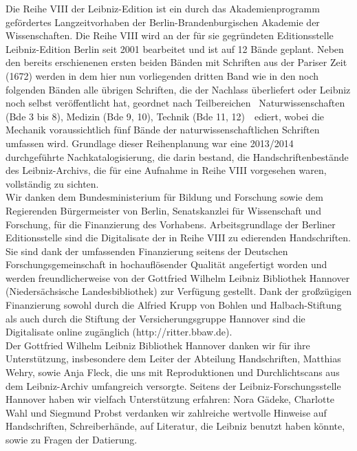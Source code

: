 \thispagestyle{empty}
{\vrule height 0mm depth 30mm width 0mm}
\vspace*{2em}
\par\noindent 
Die Reihe VIII der Leibniz-Edition ist ein durch das Akademienprogramm gefördertes Langzeitvorhaben der Berlin-Brandenburgischen Akademie der Wissenschaften. Die Reihe VIII wird an der für sie gegründeten Editionsstelle Leibniz-Edition Berlin seit 2001 bearbeitet und  ist auf 12 Bände geplant. Neben den bereits erschienenen ersten beiden Bänden mit Schriften aus der Pariser Zeit (1672) werden in dem hier nun vorliegenden dritten Band wie in den noch folgenden Bänden alle übrigen Schriften, die der Nachlass überliefert oder Leibniz noch selbst veröffentlicht hat, geordnet nach Teilbereichen \textendash\ Naturwissenschaften (Bde 3 bis 8), Medizin (Bde 9, 10), Technik (Bde 11, 12)\ \textendash\  ediert, wobei die Mechanik voraussichtlich fünf Bände der naturwissenschaftlichen Schriften umfassen wird. Grundlage dieser Reihenplanung war eine 2013/2014 durchgeführte Nachkatalogisierung, die darin bestand, die Handschriftenbestände des Leibniz-Archivs, die für eine Aufnahme in Reihe VIII vorgesehen waren, vollständig zu sichten.
\\ \indent
Wir danken dem Bundesministerium für Bildung und Forschung sowie dem Regierenden Bürgermeister von Berlin, Senatskanzlei für Wissenschaft und Forschung, für die Finanzierung des Vorhabens. Arbeitsgrundlage der Berliner Editionsstelle sind die Digitalisate der in Reihe VIII zu edierenden Handschriften. Sie sind dank der umfassenden Finanzierung seitens der Deutschen Forschungsgemeinschaft in hochauflösender Qualität angefertigt worden und werden freundlicherweise von der Gottfried Wilhelm Leibniz Bibliothek Hannover (Niedersächsische Landesbibliothek) zur Verfügung gestellt. Dank der großzügigen Finanzierung sowohl durch die Alfried Krupp von Bohlen und Halbach-Stiftung als auch durch die Stiftung der Versicherungsgruppe Hannover sind die Digitalisate online zugänglich (http://ritter.bbaw.de). 
\\ \indent
Der Gottfried Wilhelm Leibniz Bibliothek Hannover danken wir für ihre Unterstützung, insbesondere dem Leiter der Abteilung Handschriften, Matthias Wehry, sowie Anja Fleck, die uns mit Reproduktionen und Durchlichtscans aus dem Leibniz-Archiv umfangreich versorgte.
Seitens der Leibniz-Forschungsstelle Hannover haben wir vielfach Unterstützung erfahren: Nora Gädeke, Charlotte Wahl und Siegmund Probst verdanken wir zahlreiche wertvolle Hinweise auf Handschriften, Schreiberhände, auf Literatur, die Leibniz benutzt haben könnte, sowie zu Fragen der Datierung.
